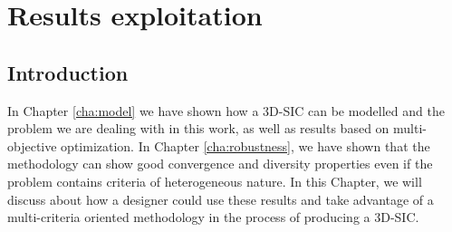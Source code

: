 \chapter{Results exploitation}

\begin{summary}
\lipsum[1]
\end{summary}

\section{Introduction}
In Chapter \ref{cha:model} we have shown how a 3D-SIC can be modelled and the problem we are dealing with in this work, as well as results based on multi-objective optimization. In Chapter \ref{cha:robustness}, we have shown that the methodology can show good convergence and diversity properties even if the problem contains criteria of heterogeneous nature. In this Chapter, we will discuss about how a designer could use these results and take advantage of a multi-criteria oriented methodology in the process of producing a 3D-SIC.

